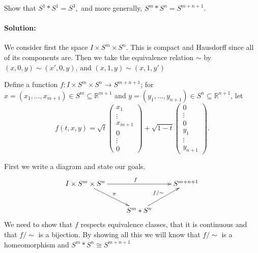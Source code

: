 \documentclass{article}
\begin{document}
\begin{exmp}
    Show that $ S^{1}* S^{1}= S^{3}, $ and more generally, $ S^{m}* S^{n}= S^{m+n+1} $.
\end{exmp}

\paragraph{Solution:} 

\iffalse
On page 9, Hatcher provides an example, that $S^{0}*\dots*S^{0}$ joined $n$ times, is homeomorphic to $S^{n-1}$.  Thanks to associativity of $*$, this gives the desired result:
\[
    S^{m}*S^{n}=\underbrace{S^0*\dots*S^0}_{m+1 \text{ times}} * \underbrace{S^0*\dots*S^0}_{n+1 \text{ times}}
    =\underbrace{S^0*\dots*S^0}_{m+n+2 \text{ times}} =S^{m+n+1}
.\] 
\fi

    We consider first the space $I\times S^{m}\times S^{n}$. This is compact and Hausdorff since all of its components are. Then we take the equivalence relation $\sim $ by 
 $(x, 0, y) \sim (x', 0, y)$, and $(x, 1, y) \sim (x, 1, y')$


Define a function $f:I\times S^{m}\times S^{n} \to S^{m+n+1}$; for $x=(x_1,\dots,x_{m+1})\in S^{m}\subseteq \mathbb{R}^{m+1}$ and $y=(y_1,\dots,y_{n+1})\in S^{n}\subseteq \mathbb{R}^{n+1}$, let
\[
f(t,x,y)=
\sqrt{t} \begin{pmatrix} x_1\\\vdots \\x_{m+1}\\0\\ \vdots \\ 0 \end{pmatrix} +\sqrt{1-t} \begin{pmatrix} 0\\ \vdots \\ 0\\ y_1\\\vdots \\y_{n+1} \end{pmatrix} 
.\] 

First we write a diagram and state our goals.
\[\xymatrix{
        I\times S^{m}\times S^{n}\ar@{->}[rr]^{f}    
        \ar@{->}[rd]^{\pi}
        &&S^{m+n+1}\\
        &S^{m}*S^{n}\ar@{->}[ur]^{f / \sim }%
}\]
We  need to show that $f$ respects equivalence classes, that it is continuous and that $f/\sim $ is a bijection. By showing all this we will know that $f / \sim $ is a homeomorphism and $S^{m}*S^{n}\cong S^{m+n+1}$
\end{document}
